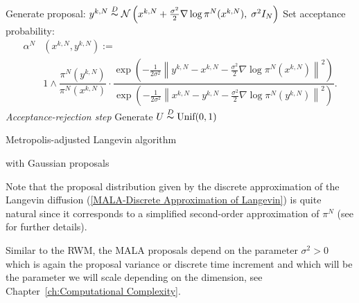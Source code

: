 \IncMargin{1em}
\begin{algorithm}[htb]
\DontPrintSemicolon


\BlankLine

{
  Generate proposal: $ y^{k,N} \stackrel{D}{\thicksim} \mathcal{N}\left(x^{k,N} + \frac{\sigma^2}{2} \nabla \log \pi^{N}(x^{k,N}), \; \sigma^2 I_N\right) $\;
  Set acceptance probability:
  \begin{align*}
   \alpha^{N} & ( x^{k,N}, y^{k,N} )  := \\ 
   & 1 \wedge  \dfrac{\pi^{N}(y^{k,N}) }{\pi^{N}(x^{k,N})} \cdot
    \dfrac{ \exp{\left( - \frac{1}{2\sigma^2} \left\| y^{k,N} - x^{k,N} - \frac{\sigma^2}{2} \nabla \log \pi^{N}(x^{k,N}) \right\|^2 \right)} }{ \exp{\left( - \frac{1}{2\sigma^2} \left\| x^{k,N} - y^{k,N} - \frac{\sigma^2}{2} \nabla \log \pi^{N}(y^{k,N}) \right\|^2 \right)} }.    
  \end{align*}\label{MALAAlgo-AcceptanceProba}
  \emph{Acceptance-rejection step}\;
  Generate $ U \stackrel{D}{\thicksim} \text{Unif}(0,1) $\;

}
\caption{Metropolis-adjusted Langevin algorithm}\label{Algo-MALA} with Gaussian proposals
\end{algorithm}\DecMargin{1em}


\begin{rem}
 Note that the proposal distribution given by the discrete approximation of the Langevin diffusion (\ref{MALA-Discrete Approximation of Langevin}) is quite natural since it corresponds to a simplified second-order approximation of $ \pi^{N} $ (see \autocite[Section 7.8.5]{Robert2005} for further details).
\end{rem} 

Similar to the RWM, the MALA proposals depend on the parameter $ \sigma^2 > 0 $ which is again the proposal variance or discrete time increment and which will be the parameter we will scale depending on the dimension, see Chapter~\ref{ch:Computational Complexity}.

